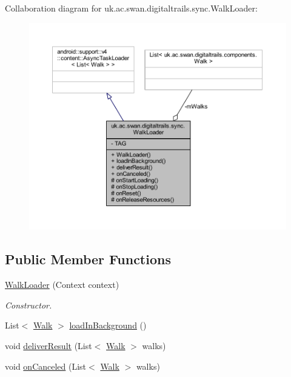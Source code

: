 Collaboration diagram for uk.\+ac.\+swan.\+digitaltrails.\+sync.\+Walk\+Loader\+:
\nopagebreak
\begin{figure}[H]
\begin{center}
\leavevmode
\includegraphics[width=350pt]{classuk_1_1ac_1_1swan_1_1digitaltrails_1_1sync_1_1_walk_loader__coll__graph}
\end{center}
\end{figure}
\subsection*{Public Member Functions}
\begin{DoxyCompactItemize}
\item 
\hyperlink{classuk_1_1ac_1_1swan_1_1digitaltrails_1_1sync_1_1_walk_loader_a819510c5c7225df9050346b421a0875d}{Walk\+Loader} (Context context)
\begin{DoxyCompactList}\small\item\em Constructor. \end{DoxyCompactList}\item 
List$<$ \hyperlink{classuk_1_1ac_1_1swan_1_1digitaltrails_1_1components_1_1_walk}{Walk} $>$ \hyperlink{classuk_1_1ac_1_1swan_1_1digitaltrails_1_1sync_1_1_walk_loader_ab3d165cd6a205be4b4be3d0196f82a2f}{load\+In\+Background} ()
\item 
void \hyperlink{classuk_1_1ac_1_1swan_1_1digitaltrails_1_1sync_1_1_walk_loader_a8587e0e55cac69b0ea2b7c0e247c560a}{deliver\+Result} (List$<$ \hyperlink{classuk_1_1ac_1_1swan_1_1digitaltrails_1_1components_1_1_walk}{Walk} $>$ walks)
\item 
void \hyperlink{classuk_1_1ac_1_1swan_1_1digitaltrails_1_1sync_1_1_walk_loader_add9c65d109a847025442f3a8d6c9c578}{on\+Canceled} (List$<$ \hyperlink{classuk_1_1ac_1_1swan_1_1digitaltrails_1_1components_1_1_walk}{Walk} $>$ walks)
\end{DoxyCompactItemize}
